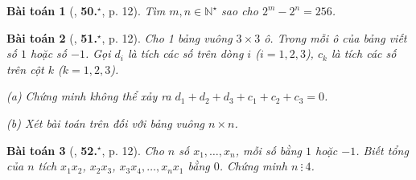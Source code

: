 \documentclass{article}
\numberwithin{equation}{section}
\newtheorem{baitoan}{Bài toán}[section]
\begin{document}
\begin{baitoan}[\cite{Binh_Toan_7_tap_1}, \textbf{50.}${}^\star$, p. 12]
	Tìm $m,n\in\mathbb{N}^\star$ sao cho $2^m - 2^n = 256$.
\end{baitoan}

\begin{baitoan}[\cite{Binh_Toan_7_tap_1}, \textbf{51.}${}^\star$, p. 12]
	Cho 1 bảng vuông $3\times 3$ ô. Trong mỗi ô của bảng viết số $1$ hoặc số $-1$. Gọi $d_i$ là tích các số trên dòng $i$ ($i = 1,2,3$), $c_k$ là tích các số trên cột $k$ ($k = 1,2,3$).
	\begin{enumerate*}
		\item[(a)] Chứng minh không thể xảy ra $d_1 + d_2 + d_3 + c_1 + c_2 + c_3 = 0$.
		\item[(b)] Xét bài toán trên đối với bảng vuông $n\times n$.
	\end{enumerate*}
\end{baitoan}

\begin{baitoan}[\cite{Binh_Toan_7_tap_1}, \textbf{52.}${}^\star$, p. 12]
	Cho $n$ số $x_1,\ldots,x_n$, mỗi số bằng $1$ hoặc $-1$. Biết tổng của $n$ tích $x_1x_2$, $x_2x_3$, $x_3x_4,\ldots,x_nx_1$ bằng $0$. Chứng minh $n\ \vdots\ 4$.
\end{baitoan}


\printbibliography[heading=bibintoc]
	
\end{document}
